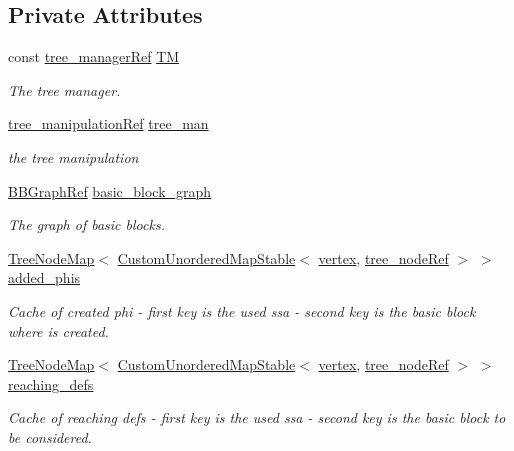 \subsection*{Private Attributes}
\begin{DoxyCompactItemize}
\item 
const \hyperlink{tree__manager_8hpp_a96ff150c071ce11a9a7a1e40590f205e}{tree\+\_\+manager\+Ref} \hyperlink{classBuildVirtualPhi_a5e37981c5c3abb64b6c62a87f556f94d}{TM}
\begin{DoxyCompactList}\small\item\em The tree manager. \end{DoxyCompactList}\item 
\hyperlink{tree__manipulation_8hpp_a1a9460e3a2f9fc6a96cfd2f24cc9b2a5}{tree\+\_\+manipulation\+Ref} \hyperlink{classBuildVirtualPhi_adc82c90118858d6c7fa2ac3c909995ac}{tree\+\_\+man}
\begin{DoxyCompactList}\small\item\em the tree manipulation \end{DoxyCompactList}\item 
\hyperlink{basic__block_8hpp_a0e7f233d1b83cad0bfd5aa865f0d3532}{B\+B\+Graph\+Ref} \hyperlink{classBuildVirtualPhi_a714a29c4aa71ff5ed58088ddc116a94a}{basic\+\_\+block\+\_\+graph}
\begin{DoxyCompactList}\small\item\em The graph of basic blocks. \end{DoxyCompactList}\item 
\hyperlink{classTreeNodeMap}{Tree\+Node\+Map}$<$ \hyperlink{custom__map_8hpp_a7314a7df1cdb3a3acf478ab86e95c226}{Custom\+Unordered\+Map\+Stable}$<$ \hyperlink{graph_8hpp_abefdcf0544e601805af44eca032cca14}{vertex}, \hyperlink{tree__node_8hpp_a6ee377554d1c4871ad66a337eaa67fd5}{tree\+\_\+node\+Ref} $>$ $>$ \hyperlink{classBuildVirtualPhi_a1c790417deb37613e44b658809602818}{added\+\_\+phis}
\begin{DoxyCompactList}\small\item\em Cache of created phi -\/ first key is the used ssa -\/ second key is the basic block where is created. \end{DoxyCompactList}\item 
\hyperlink{classTreeNodeMap}{Tree\+Node\+Map}$<$ \hyperlink{custom__map_8hpp_a7314a7df1cdb3a3acf478ab86e95c226}{Custom\+Unordered\+Map\+Stable}$<$ \hyperlink{graph_8hpp_abefdcf0544e601805af44eca032cca14}{vertex}, \hyperlink{tree__node_8hpp_a6ee377554d1c4871ad66a337eaa67fd5}{tree\+\_\+node\+Ref} $>$ $>$ \hyperlink{classBuildVirtualPhi_af6b51aecd3ea976db404446be9978c55}{reaching\+\_\+defs}
\begin{DoxyCompactList}\small\item\em Cache of reaching defs -\/ first key is the used ssa -\/ second key is the basic block to be considered. \end{DoxyCompactList}\end{DoxyCompactItemize}
